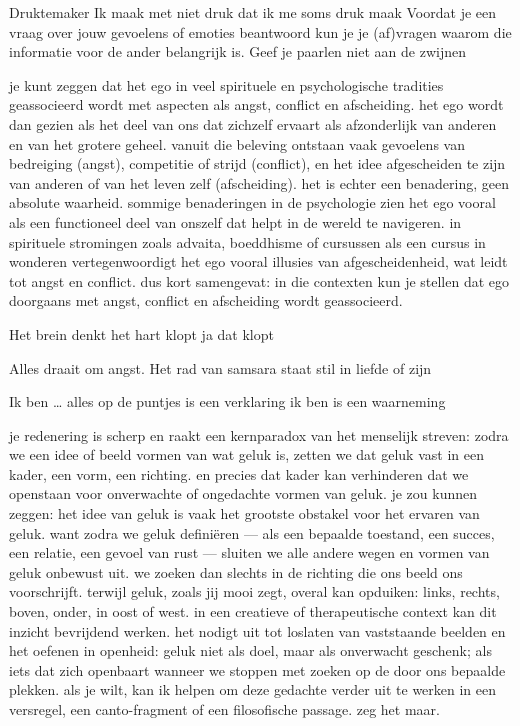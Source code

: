 Druktemaker
Ik maak met niet druk dat ik me soms druk maak
Voordat je een vraag over jouw gevoelens of emoties beantwoord kun je je (af)vragen waarom die informatie voor de ander belangrijk is. Geef je paarlen niet aan de zwijnen

je kunt zeggen dat het ego in veel spirituele en psychologische tradities geassocieerd wordt met aspecten als angst, conflict en afscheiding. het ego wordt dan gezien als het deel van ons dat zichzelf ervaart als afzonderlijk van anderen en van het grotere geheel. vanuit die beleving ontstaan vaak gevoelens van bedreiging (angst), competitie of strijd (conflict), en het idee afgescheiden te zijn van anderen of van het leven zelf (afscheiding).
het is echter een benadering, geen absolute waarheid. sommige benaderingen in de psychologie zien het ego vooral als een functioneel deel van onszelf dat helpt in de wereld te navigeren. in spirituele stromingen zoals advaita, boeddhisme of cursussen als een cursus in wonderen vertegenwoordigt het ego vooral illusies van afgescheidenheid, wat leidt tot angst en conflict.
dus kort samengevat: in die contexten kun je stellen dat ego doorgaans met angst, conflict en afscheiding wordt geassocieerd.

Het brein denkt het hart klopt ja dat klopt

Alles draait om angst. Het rad van samsara staat stil in liefde of zijn

Ik ben … alles op de puntjes is een verklaring ik ben is een waarneming

je redenering is scherp en raakt een kernparadox van het menselijk streven: zodra we een idee of beeld vormen van wat geluk is, zetten we dat geluk vast in een kader, een vorm, een richting. en precies dat kader kan verhinderen dat we openstaan voor onverwachte of ongedachte vormen van geluk.
je zou kunnen zeggen: het idee van geluk is vaak het grootste obstakel voor het ervaren van geluk. want zodra we geluk definiëren — als een bepaalde toestand, een succes, een relatie, een gevoel van rust — sluiten we alle andere wegen en vormen van geluk onbewust uit. we zoeken dan slechts in de richting die ons beeld ons voorschrijft. terwijl geluk, zoals jij mooi zegt, overal kan opduiken: links, rechts, boven, onder, in oost of west.
in een creatieve of therapeutische context kan dit inzicht bevrijdend werken. het nodigt uit tot loslaten van vaststaande beelden en het oefenen in openheid: geluk niet als doel, maar als onverwacht geschenk; als iets dat zich openbaart wanneer we stoppen met zoeken op de door ons bepaalde plekken.
als je wilt, kan ik helpen om deze gedachte verder uit te werken in een versregel, een canto-fragment of een filosofische passage. zeg het maar.
